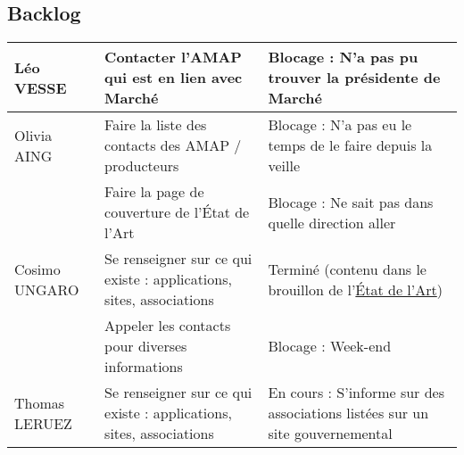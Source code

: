     \subsection{Backlog}
        \begin{tabularx}{\textwidth}{|p{3.2cm}|X|X|}
            \hline
            
            Léo VESSE
            & Contacter l'AMAP qui est en lien avec Marché
            & Blocage : N'a pas pu trouver la présidente de Marché\\
            
            \hline
            
            Olivia AING
            &  Faire la liste des contacts des AMAP / producteurs
            &  Blocage : N'a pas eu le temps de le faire depuis la veille\\
            \cline{2-3}
            &  Faire la page de couverture de l’État de l’Art
            &  Blocage : Ne sait pas dans quelle direction aller\\
            
            \hline
            
            Cosimo UNGARO
            & Se renseigner sur ce qui existe : applications, sites, associations
            & Terminé (contenu dans le brouillon de l'\href{https://docs.google.com/document/d/1kN3yLbHacPv0A-VE_MOV0zmUfvvmW8FzXHhSFT4Q7lM/edit}{État de l'Art})\\
            \cline{2-3}
            & Appeler les contacts pour diverses informations
            & Blocage : Week-end\\
            \hline
            
            Thomas LERUEZ
            & Se renseigner sur ce qui existe : applications, sites, associations
            & En cours : S'informe sur des associations listées sur un site gouvernemental\\
            
            \hline
        \end{tabularx}

